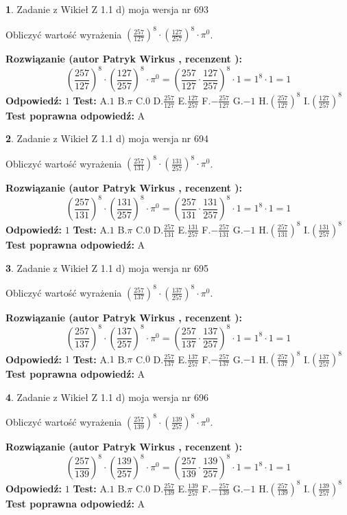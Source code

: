 \documentclass[12pt, a4paper]{article}
\theoremstyle{definition} %
\newtheorem{zad}{}
\newcommand{\zadStart}[1]{\begin{zad}#1\newline}
\newcommand{\zadStop}{\end{zad}}
\newcommand{\rozwStart}[2]{\noindent \textbf{Rozwiązanie (autor #1 , recenzent #2): }\newline}
\newcommand{\rozwStop}{\newline}
\newcommand{\odpStart}{\noindent \textbf{Odpowiedź:}\newline}
\newcommand{\odpStop}{\newline}
\newcommand{\testStart}{\noindent \textbf{Test:}\newline}
\newcommand{\testStop}{\newline}
\newcommand{\kluczStart}{\noindent \textbf{Test poprawna odpowiedź:}\newline}
\newcommand{\kluczStop}{\newline}
\begin{document}
\zadStart{Zadanie z Wikieł Z 1.1 d) moja wersja nr 693}

Obliczyć wartość wyrażenia $(\frac{257}{127})^{8} \cdot (\frac{127}{257})^{8} \cdot \pi^{0}$.
\zadStop
\rozwStart{Patryk Wirkus}{}
$$(\frac{257}{127})^{8} \cdot (\frac{127}{257})^{8} \cdot \pi^{0} = (\frac{257}{127} \cdot \frac{127}{257})^{8} \cdot 1 = 1^{8} \cdot 1 = 1$$
\rozwStop
\odpStart
$1$
\odpStop
\testStart
A.$1$ B.$\pi$ C.$0$ D.$\frac{257}{127}$ E.$\frac{127}{257}$
F.$-\frac{257}{127}$ G.$-1$
H.$(\frac{257}{127})^{8}$
I.$(\frac{127}{257})^{8}$
\testStop
\kluczStart
A
\kluczStop



\zadStart{Zadanie z Wikieł Z 1.1 d) moja wersja nr 694}

Obliczyć wartość wyrażenia $(\frac{257}{131})^{8} \cdot (\frac{131}{257})^{8} \cdot \pi^{0}$.
\zadStop
\rozwStart{Patryk Wirkus}{}
$$(\frac{257}{131})^{8} \cdot (\frac{131}{257})^{8} \cdot \pi^{0} = (\frac{257}{131} \cdot \frac{131}{257})^{8} \cdot 1 = 1^{8} \cdot 1 = 1$$
\rozwStop
\odpStart
$1$
\odpStop
\testStart
A.$1$ B.$\pi$ C.$0$ D.$\frac{257}{131}$ E.$\frac{131}{257}$
F.$-\frac{257}{131}$ G.$-1$
H.$(\frac{257}{131})^{8}$
I.$(\frac{131}{257})^{8}$
\testStop
\kluczStart
A
\kluczStop



\zadStart{Zadanie z Wikieł Z 1.1 d) moja wersja nr 695}

Obliczyć wartość wyrażenia $(\frac{257}{137})^{8} \cdot (\frac{137}{257})^{8} \cdot \pi^{0}$.
\zadStop
\rozwStart{Patryk Wirkus}{}
$$(\frac{257}{137})^{8} \cdot (\frac{137}{257})^{8} \cdot \pi^{0} = (\frac{257}{137} \cdot \frac{137}{257})^{8} \cdot 1 = 1^{8} \cdot 1 = 1$$
\rozwStop
\odpStart
$1$
\odpStop
\testStart
A.$1$ B.$\pi$ C.$0$ D.$\frac{257}{137}$ E.$\frac{137}{257}$
F.$-\frac{257}{137}$ G.$-1$
H.$(\frac{257}{137})^{8}$
I.$(\frac{137}{257})^{8}$
\testStop
\kluczStart
A
\kluczStop



\zadStart{Zadanie z Wikieł Z 1.1 d) moja wersja nr 696}

Obliczyć wartość wyrażenia $(\frac{257}{139})^{8} \cdot (\frac{139}{257})^{8} \cdot \pi^{0}$.
\zadStop
\rozwStart{Patryk Wirkus}{}
$$(\frac{257}{139})^{8} \cdot (\frac{139}{257})^{8} \cdot \pi^{0} = (\frac{257}{139} \cdot \frac{139}{257})^{8} \cdot 1 = 1^{8} \cdot 1 = 1$$
\rozwStop
\odpStart
$1$
\odpStop
\testStart
A.$1$ B.$\pi$ C.$0$ D.$\frac{257}{139}$ E.$\frac{139}{257}$
F.$-\frac{257}{139}$ G.$-1$
H.$(\frac{257}{139})^{8}$
I.$(\frac{139}{257})^{8}$
\testStop
\kluczStart
A
\kluczStop
\end{document}
